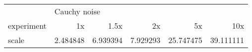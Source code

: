 \begin{tabular}{lrrrrr}
\toprule
{} & \multicolumn{5}{l}{Cauchy noise} \\
experiment &           1x &      1.5x &        2x &         5x &        10x \\
\midrule
scale &     2.484848 &  6.939394 &  7.929293 &  25.747475 &  39.111111 \\
\bottomrule
\end{tabular}
